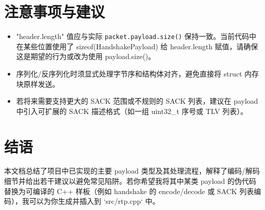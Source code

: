 \documentclass[11pt,a4paper]{article}
\begin{document}
\section{注意事项与建议}
\begin{itemize}
  \item "header.length" 值应与实际 \texttt{packet.payload.size()} 保持一致。当前代码中在某些位置使用了 sizeof(HandshakePayload) 给 header.length 赋值，请确保这是期望的行为或改为使用 payload.size()。
  \item 序列化/反序列化时须显式处理字节序和结构体对齐，避免直接将 struct 内存块原样发送。
  \item 若将来需要支持更大的 SACK 范围或不规则的 SACK 列表，建议在 payload 中引入可扩展的 SACK 描述格式（如一组 uint32_t 序号或 TLV 列表）。
\end{itemize}

\section{结语}
本文档总结了项目中已实现的主要 payload 类型及其处理流程，解释了编码/解码细节并给出若干建议以避免常见陷阱。若你希望我将其中某类 payload 的伪代码替换为可编译的 C++ 样板（例如 handshake 的 encode/decode 或 SACK 列表编码），我可以为你生成并插入到 `src/rtp.cpp` 中。
\end{document}

